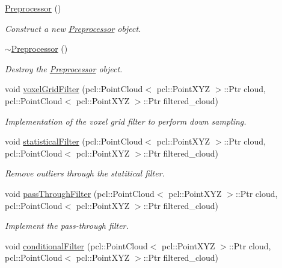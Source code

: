 \begin{DoxyCompactItemize}
\item 
\hyperlink{classhull__abstraction_1_1_preprocessor_aa1e7b3418d273ceddd2faa0777f3598c}{Preprocessor} ()
\begin{DoxyCompactList}\small\item\em Construct a new \hyperlink{classhull__abstraction_1_1_preprocessor}{Preprocessor} object. \end{DoxyCompactList}\item 
\hyperlink{classhull__abstraction_1_1_preprocessor_a880dfe2a68232c6aea2ad41743df3d97}{$\sim$\+Preprocessor} ()
\begin{DoxyCompactList}\small\item\em Destroy the \hyperlink{classhull__abstraction_1_1_preprocessor}{Preprocessor} object. \end{DoxyCompactList}\item 
void \hyperlink{classhull__abstraction_1_1_preprocessor_a423d6c8cb5b08f8387290aae47184b3b}{voxel\+Grid\+Filter} (pcl\+::\+Point\+Cloud$<$ pcl\+::\+Point\+X\+YZ $>$\+::Ptr cloud, pcl\+::\+Point\+Cloud$<$ pcl\+::\+Point\+X\+YZ $>$\+::Ptr filtered\+\_\+cloud)
\begin{DoxyCompactList}\small\item\em Implementation of the voxel grid filter to perform down sampling. \end{DoxyCompactList}\item 
void \hyperlink{classhull__abstraction_1_1_preprocessor_a494877684eca0eaf7207c8655140b692}{statistical\+Filter} (pcl\+::\+Point\+Cloud$<$ pcl\+::\+Point\+X\+YZ $>$\+::Ptr cloud, pcl\+::\+Point\+Cloud$<$ pcl\+::\+Point\+X\+YZ $>$\+::Ptr filtered\+\_\+cloud)
\begin{DoxyCompactList}\small\item\em Remove outliers through the statitical filter. \end{DoxyCompactList}\item 
void \hyperlink{classhull__abstraction_1_1_preprocessor_a4912126b50bdac35c63f521e3bc04314}{pass\+Through\+Filter} (pcl\+::\+Point\+Cloud$<$ pcl\+::\+Point\+X\+YZ $>$\+::Ptr cloud, pcl\+::\+Point\+Cloud$<$ pcl\+::\+Point\+X\+YZ $>$\+::Ptr filtered\+\_\+cloud)
\begin{DoxyCompactList}\small\item\em Implement the pass-\/through filter. \end{DoxyCompactList}\item 
void \hyperlink{classhull__abstraction_1_1_preprocessor_a95229af873f6f1a74c832340f8f9b7bf}{conditional\+Filter} (pcl\+::\+Point\+Cloud$<$ pcl\+::\+Point\+X\+YZ $>$\+::Ptr cloud, pcl\+::\+Point\+Cloud$<$ pcl\+::\+Point\+X\+YZ $>$\+::Ptr filtered\+\_\+cloud)

\end{DoxyCompactItemize}
